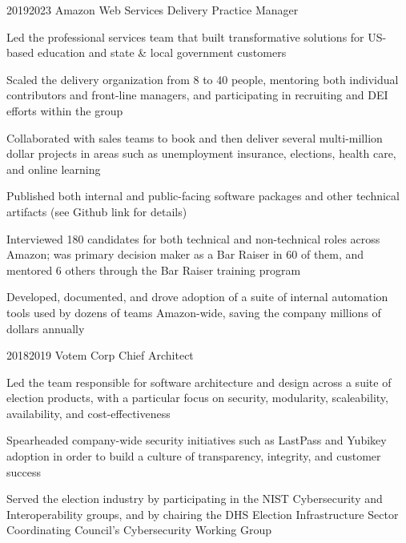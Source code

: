 \documentclass{article}
\begin{document}
\job
  {2019}{2023}
  {Amazon Web Services}
  {Delivery Practice Manager}
  {\begin{achievements}
    \item Led the professional services team that built transformative solutions for US-based education and state \& local government customers
    \item Scaled the delivery organization from 8 to 40 people, mentoring both individual contributors and front-line managers, and participating in recruiting and DEI efforts within the group
    \item Collaborated with sales teams to book and then deliver several multi-million dollar projects in areas such as unemployment insurance, elections, health care, and online learning
    \item Published both internal and public-facing software packages and other technical artifacts (see Github link for details)
    \item Interviewed 180 candidates for both technical and non-technical roles across Amazon; was primary decision maker as a Bar Raiser in 60 of them, and mentored 6 others through the Bar Raiser training program
    \item Developed, documented, and drove adoption of a suite of internal automation tools used by dozens of teams Amazon-wide, saving the company millions of dollars annually
  \end{achievements}}

\job
  {2018}{2019}
  {Votem Corp}
  {Chief Architect}
  {\begin{achievements}
    \item Led the team responsible for software architecture and design across a suite of election products, with a particular focus on security, modularity, scaleability, availability, and cost-effectiveness
    \item Spearheaded company-wide security initiatives such as LastPass and Yubikey adoption in order to build a culture of transparency, integrity, and customer success
    \item Served the election industry by participating in the NIST Cybersecurity and Interoperability groups, and by chairing the DHS Election Infrastructure Sector Coordinating Council's Cybersecurity Working Group
  \end{achievements}}
\end{document}
